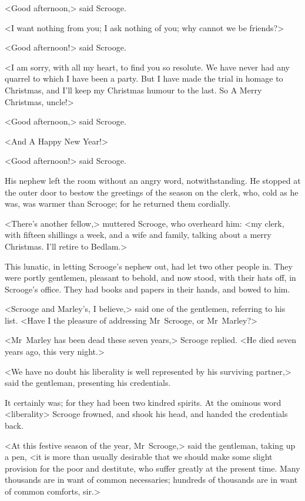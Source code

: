 <Good afternoon,> said Scrooge.

<I want nothing from you; I ask nothing of you; why cannot we be friends?>

<Good afternoon!> said Scrooge.

<I am sorry, with all my heart, to find you so resolute. We have never had any quarrel to which I have been a party. But I have made the trial in homage to Christmas, and I'll keep my Christmas humour to the last. So A Merry Christmas, uncle!>

<Good afternoon,> said Scrooge.

<And A Happy New Year!>

<Good afternoon!> said Scrooge.

His nephew left the room without an angry word, notwithstanding. He stopped at the outer door to bestow the greetings of the season on the clerk, who, cold as he was, was warmer than Scrooge; for he returned them cordially.

<There's another fellow,> muttered Scrooge, who overheard him: <my clerk, with fifteen shillings a week, and a wife and family, talking about a merry Christmas. I'll retire to Bedlam.>

This lunatic, in letting Scrooge's nephew out, had let two other people in. They were portly gentlemen, pleasant to behold, and now stood, with their hats off, in Scrooge's office. They had books and papers in their hands, and bowed to him.

<Scrooge and Marley's, I believe,> said one of the gentlemen, referring to his list. <Have I the pleasure of addressing Mr~Scrooge, or Mr~Marley?>

<Mr~Marley has been dead these seven years,> Scrooge replied. <He died seven years ago, this very night.>

<We have no doubt his liberality is well represented by his surviving partner,> said the gentleman, presenting his credentials.

It certainly was; for they had been two kindred spirits. At the ominous word <liberality> Scrooge frowned, and shook his head, and handed the credentials back.

<At this festive season of the year, Mr~Scrooge,> said the gentleman, taking up a pen, <it is more than usually desirable that we should make some slight provision for the poor and destitute, who suffer greatly at the present time. Many thousands are in want of common necessaries; hundreds of thousands are in want of common comforts, sir.>

